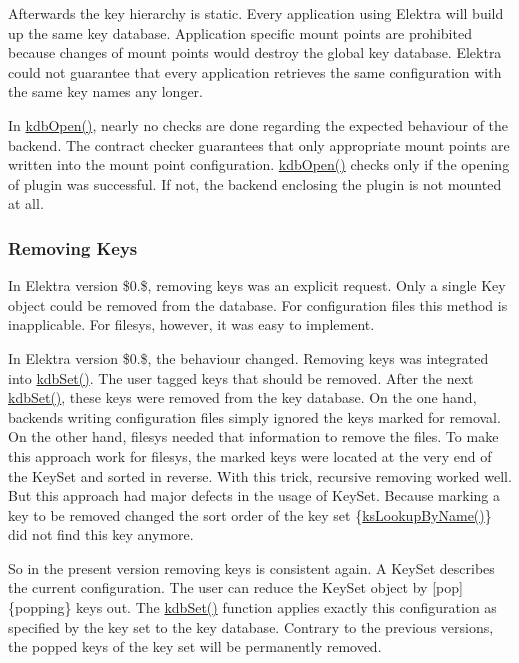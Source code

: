 Afterwards the key hierarchy is static. Every application using Elektra will build up the same key database. Application specific mount points are prohibited because changes of mount points would destroy the global key database. Elektra could not guarantee that every application retrieves the same configuration with the same key names any longer.

In {\ttfamily \hyperlink{group__kdb_ga6808defe5870f328dd17910aacbdc6ca}{kdb\+Open()}}, nearly no checks are done regarding the expected behaviour of the backend. The contract checker guarantees that only appropriate mount points are written into the mount point configuration. {\ttfamily \hyperlink{group__kdb_ga6808defe5870f328dd17910aacbdc6ca}{kdb\+Open()}} checks only if the opening of plugin was successful. If not, the backend enclosing the plugin is not mounted at all.

\subsubsection*{Removing Keys}

In Elektra version \$0.\$, removing keys was an explicit request. Only a single {\ttfamily Key} object could be removed from the database. For configuration files this method is inapplicable. For {\ttfamily filesys}, however, it was easy to implement.

In Elektra version \$0.\$, the behaviour changed. Removing keys was integrated into {\ttfamily \hyperlink{group__kdb_ga11436b058408f83d303ca5e996832bcf}{kdb\+Set()}}. The user tagged keys that should be removed. After the next {\ttfamily \hyperlink{group__kdb_ga11436b058408f83d303ca5e996832bcf}{kdb\+Set()}}, these keys were removed from the key database. On the one hand, backends writing configuration files simply ignored the keys marked for removal. On the other hand, {\ttfamily filesys} needed that information to remove the files. To make this approach work for {\ttfamily filesys}, the marked keys were located at the very end of the {\ttfamily Key\+Set} and sorted in reverse. With this trick, recursive removing worked well. But this approach had major defects in the usage of {\ttfamily Key\+Set}. Because marking a key to be removed changed the sort order of the key set \{\hyperlink{group__keyset_gad2e30fb6d4739d917c5abb2ac2f9c1a1}{ks\+Lookup\+By\+Name()}\} did not find this key anymore.

So in the present version removing keys is consistent again. A {\ttfamily Key\+Set} describes the current configuration. The user can reduce the {\ttfamily Key\+Set} object by \mbox{[}pop\mbox{]}\{popping\} keys out. The {\ttfamily \hyperlink{group__kdb_ga11436b058408f83d303ca5e996832bcf}{kdb\+Set()}} function applies exactly this configuration as specified by the key set to the key database. Contrary to the previous versions, the popped keys of the key set will be permanently removed.

